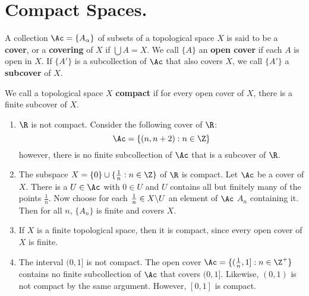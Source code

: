 
\section{Compact Spaces.}

\begin{definition}
    A collection $\Ac=\{A_{\alpha}\}$ of subsets of a topological space $X$ is said to be a  \textbf{cover}, or a
    \textbf{covering} of $X$ if  $\bigcup{A}=X$. We call $\{A\}$ an \textbf{open cover} if each $A$
    is open in  $X$. If  $\{A'\}$ is a subcollection of $\Ac$ that also covers $X$, we call
    $\{A'\}$ a \textbf{subcover} of $X$.
\end{definition}

\begin{definition}
    We call a topological space $X$ \textbf{compact} if for every open cover of $X$, there is a
    finite subcover of $X$.
\end{definition}

\begin{example}
    \begin{enumerate}[label=(\arabic*)]
        \item     $\R$ is not compact. Consider the following cover of  $\R$:
            \begin{equation*}
                \Ac=\{(n,n+2):n \in \Z\}
            \end{equation*}
            however, there is no finite subcollection of $\Ac$ that is a subcover of  $\R$.

        \item The subspace $X=\{0\} \cup \{\frac{1}{n}: n \in \Z\}$ of $\R$ is compact. Let  $\Ac$
            be a cover of  $X$. There is a  $U \in \Ac$ with  $0 \in U$ and $U$ contains all but
            finitely many of the points  $ \frac{1}{n}$. Now choose for each $\frac{1}{n} \in
            X \backslash U$ an element of $\Ac$ $A_{n}$ containing it. Then for all $n$,  $\{A_n\}$ is
            finite and covers $X$.

        \item If  $X$ is a finite topological space, then it is compact, since every open cover of
            $X$ is finite.

        \item The interval  $(0,1]$ is not compact. The open cover $\Ac=\{(\frac{1}{n}, 1]: n \in
            \Z^+\}$ contains no finite subcollection of $\Ac$ that covers  $(0,1]$. Likewise,
            $(0,1)$ is not compact by the same argument. However, $[0,1]$ is compact.
    \end{enumerate}
 
\end{example} 
